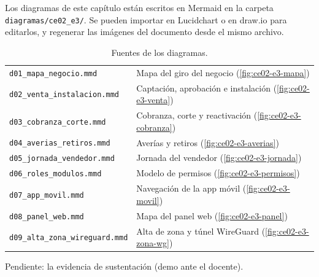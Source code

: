 Los diagramas de este capítulo están escritos en Mermaid en la carpeta
\texttt{diagramas/ce02\_e3/}. Se pueden importar en Lucidchart o en draw.io para editarlos,
y regenerar las imágenes del documento desde el mismo archivo.

\begin{table}[H]
\centering
\caption{Fuentes de los diagramas.}
\label{tab:ce02-e3-diagramas}
\small
\begin{tabularx}{\textwidth}{L{5.4cm}X}
\toprule
\texttt{d01\_mapa\_negocio.mmd} & Mapa del giro del negocio (\cref{fig:ce02-e3-mapa}) \\
\texttt{d02\_venta\_instalacion.mmd} & Captación, aprobación e instalación (\cref{fig:ce02-e3-venta}) \\
\texttt{d03\_cobranza\_corte.mmd} & Cobranza, corte y reactivación (\cref{fig:ce02-e3-cobranza}) \\
\texttt{d04\_averias\_retiros.mmd} & Averías y retiros (\cref{fig:ce02-e3-averias}) \\
\texttt{d05\_jornada\_vendedor.mmd} & Jornada del vendedor (\cref{fig:ce02-e3-jornada}) \\
\texttt{d06\_roles\_modulos.mmd} & Modelo de permisos (\cref{fig:ce02-e3-permisos}) \\
\texttt{d07\_app\_movil.mmd} & Navegación de la app móvil (\cref{fig:ce02-e3-movil}) \\
\texttt{d08\_panel\_web.mmd} & Mapa del panel web (\cref{fig:ce02-e3-panel}) \\
\texttt{d09\_alta\_zona\_wireguard.mmd} & Alta de zona y túnel WireGuard (\cref{fig:ce02-e3-zona-wg}) \\
\bottomrule
\end{tabularx}
\end{table}

\noindent Pendiente: la evidencia de sustentación (demo ante el docente).
